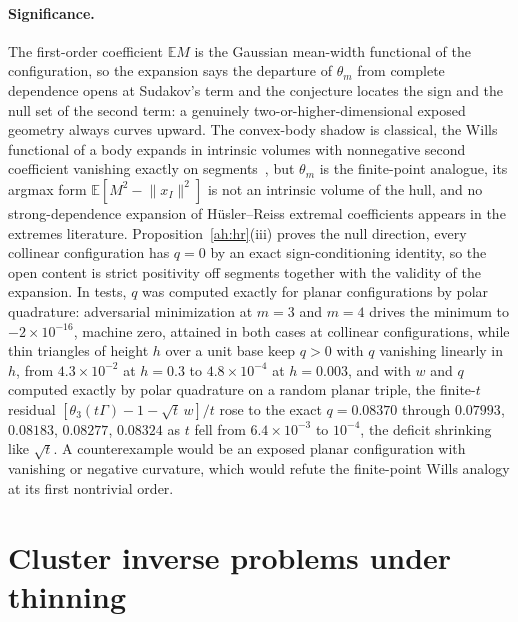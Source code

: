 \documentclass[11pt]{article}
\theoremstyle{definition}
\newcommand{\E}{\mathbb E}
\providecommand{\E}{\mathbb E}
\begin{document}
\paragraph{Significance.}
The first-order coefficient $\E M$ is the Gaussian mean-width functional of the configuration, so the expansion says the departure of $\theta_m$ from complete dependence opens at Sudakov's term and the conjecture locates the sign and the null set of the second term: a genuinely two-or-higher-dimensional exposed geometry always curves upward.  The convex-body shadow is classical, the Wills functional of a body expands in intrinsic volumes with nonnegative second coefficient vanishing exactly on segments~\cite{Vit96}, but $\theta_m$ is the finite-point analogue, its argmax form $\E[M^2-\lVert x_I\rVert^2]$ is not an intrinsic volume of the hull, and no strong-dependence expansion of H\"usler--Reiss extremal coefficients appears in the extremes literature.  Proposition~\ref{ah:hr}(iii) proves the null direction, every collinear configuration has $q=0$ by an exact sign-conditioning identity, so the open content is strict positivity off segments together with the validity of the expansion.  In tests, $q$ was computed exactly for planar configurations by polar quadrature: adversarial minimization at $m=3$ and $m=4$ drives the minimum to $-2\times10^{-16}$, machine zero, attained in both cases at collinear configurations, while thin triangles of height $h$ over a unit base keep $q>0$ with $q$ vanishing linearly in $h$, from $4.3\times10^{-2}$ at $h=0.3$ to $4.8\times10^{-4}$ at $h=0.003$, and with $w$ and $q$ computed exactly by polar quadrature on a random planar triple, the finite-$t$ residual $[\theta_3(t\Gamma)-1-\sqrt t\,w]/t$ rose to the exact $q=0.08370$ through $0.07993$, $0.08183$, $0.08277$, $0.08324$ as $t$ fell from $6.4\times10^{-3}$ to $10^{-4}$, the deficit shrinking like $\sqrt t$.  A counterexample would be an exposed planar configuration with vanishing or negative curvature, which would refute the finite-point Wills analogy at its first nontrivial order.

\section{Cluster inverse problems under thinning}
\end{document}

